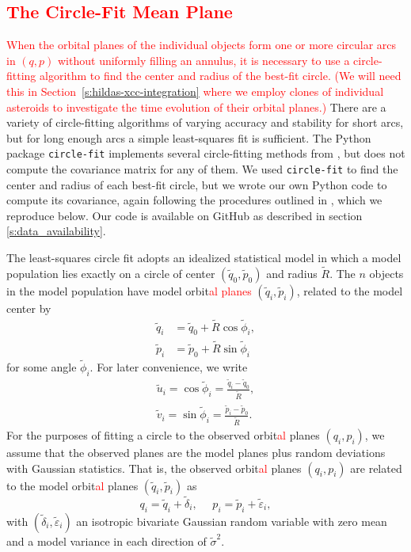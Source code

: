 \documentclass[a4paper,fleqn]{cas-sc}
\begin{document}
\begin{linenumbers}
\subsection{\textcolor{red}{The Circle-Fit Mean Plane}}
\label{ss:circle-fit-mean-plane}
\textcolor{red}{When the orbital planes of the individual objects form one or more circular arcs in $(q,p)$ without uniformly filling an annulus, it is necessary to use a circle-fitting algorithm to find the center and radius of the best-fit circle.
(We will need this in Section~\ref{s:hildas-xcc-integration} where we employ clones of individual asteroids to investigate the time evolution of their orbital planes.)
}
There are a variety of circle-fitting algorithms of varying accuracy and stability for short arcs, but for long enough arcs a simple least-squares fit is sufficient.
The Python package \texttt{circle-fit} \citep{circlefit} implements several circle-fitting methods from \citet{al2009error}, but does not compute the covariance matrix for any of them.
We used \texttt{circle-fit} to find the center and radius of each best-fit circle, but we wrote our own Python code to compute its covariance, again following the procedures outlined in \citet{al2009error}, which we reproduce below.
Our code is available on GitHub as described in section \ref{s:data_availability}.

The least-squares circle fit adopts an idealized statistical model in which a model population lies exactly on a circle of center $(\tilde{q}_0,\tilde{p}_0)$ and radius $\tilde{R}$.
The $n$ objects in the model population have model orbit\textcolor{red}{al planes} $(\tilde{q}_i,\tilde{p}_i)$, related to the model center by
\begin{align}
\tilde{q}_i &= \tilde{q}_0+\tilde{R}\cos{\tilde{\phi}_i}, \\
\tilde{p}_i &= \tilde{p}_0+\tilde{R}\sin{\tilde{\phi}_i}
\end{align}
for some angle $\tilde{\phi}_i$. 
For later convenience, we write 
\begin{align}
\tilde{u}_i=\cos{\tilde{\phi}_i}=\frac{\tilde{q}_i-\tilde{q}_0}{\tilde{R}},\\
\tilde{v}_i=\sin{\tilde{\phi}_i}=\frac{\tilde{p}_i-\tilde{p}_0}{\tilde{R}}.
\end{align}
For the purposes of fitting a circle to the observed orbit\textcolor{red}{al} planes $(q_i,p_i)$, we assume that the observed planes are the model planes plus random deviations with Gaussian statistics.
That is, the observed orbit\textcolor{red}{al} planes $(q_i,p_i)$ are related to the model orbit\textcolor{red}{al} planes $(\tilde{q}_i,\tilde{p}_i)$ as
\begin{equation}
q_i=\tilde{q}_i+\tilde{\delta}_i,\,\,\,\,\,\,\,\,p_i=\tilde{p}_i+\tilde{\varepsilon}_i,
\end{equation}
with $(\tilde{\delta}_i,\tilde{\varepsilon}_i)$ an isotropic bivariate Gaussian random variable with zero mean and a model variance in each direction of $\tilde{\sigma}^2$.


\end{linenumbers}
\end{document}
